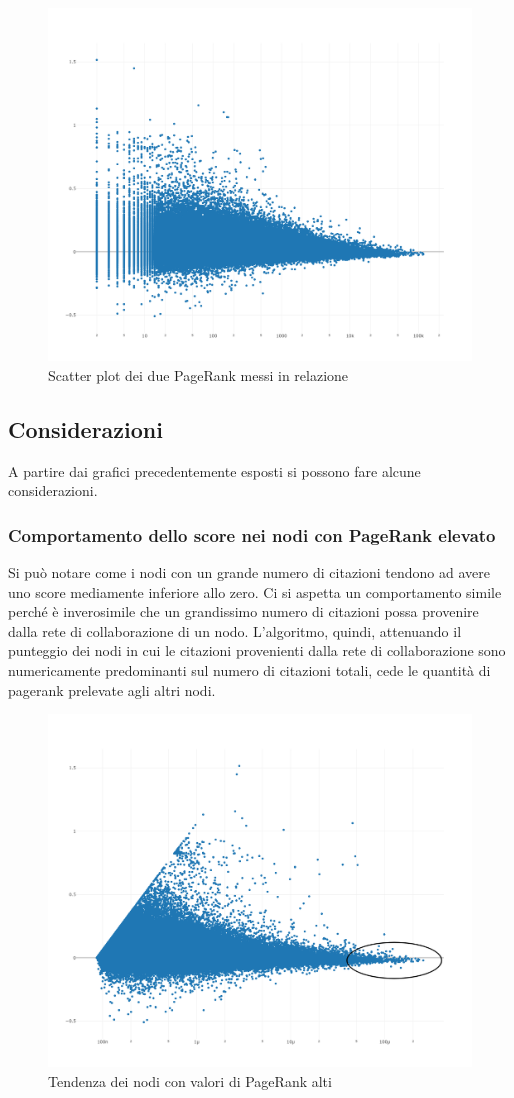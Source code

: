 \documentclass[a4paper, 12pt]{article}
\begin{document}
\begin{figure}[H]
  \includegraphics[width=\linewidth]{images/grafico-3.png}
  \caption{Scatter plot dei due PageRank messi in relazione}
\end{figure}

\subsection{Considerazioni}
A partire dai grafici precedentemente esposti si possono fare alcune considerazioni.
\subsubsection{Comportamento dello score nei nodi con PageRank elevato}
Si può notare come i nodi con un grande numero di citazioni tendono ad avere uno score mediamente inferiore allo zero. Ci si aspetta un comportamento simile perché è inverosimile che un grandissimo numero di citazioni possa provenire dalla rete di collaborazione di un nodo. L'algoritmo, quindi, attenuando il punteggio dei nodi in cui le citazioni provenienti dalla rete di collaborazione sono numericamente predominanti sul numero di citazioni totali, cede le quantità di pagerank prelevate agli altri nodi.
\begin{figure}[H]
  \includegraphics[width=0.6\linewidth]{images/grafico-4.png}
  \caption{Tendenza dei nodi con valori di PageRank alti}
\end{figure}
\end{document}
